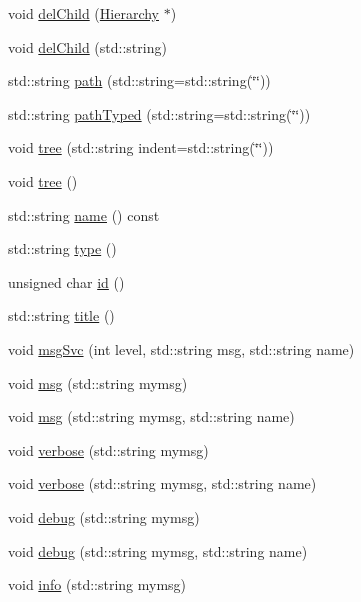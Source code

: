 \begin{DoxyCompactItemize}
void \hyperlink{classHierarchy_a2b2b359fac003233f65786a616766bde}{delChild} (\hyperlink{classHierarchy}{Hierarchy} $\ast$)
\item 
void \hyperlink{classHierarchy_a1928ac7615fe0b5e55cd707f70dc6781}{delChild} (std::string)
\item 
std::string \hyperlink{classHierarchy_aa7990fa7caf132d83e361ce033c6c65a}{path} (std::string=std::string(\char`\"{}\char`\"{}))
\item 
std::string \hyperlink{classHierarchy_a1efd56cd164d328d2002e53a10a19b8c}{pathTyped} (std::string=std::string(\char`\"{}\char`\"{}))
\item 
void \hyperlink{classHierarchy_a76e914b9a677a22a82deb74d892bf261}{tree} (std::string indent=std::string(\char`\"{}\char`\"{}))
\item 
void \hyperlink{classHierarchy_a594c294c5f60c230e106d522ed008212}{tree} ()
\item 
std::string \hyperlink{classObject_a975e888d50bfcbffda2c86368332a5cd}{name} () const 
\item 
std::string \hyperlink{classObject_a84f99f70f144a83e1582d1d0f84e4e62}{type} ()
\item 
unsigned char \hyperlink{classObject_af99145335cc61ff6e2798ea17db009d2}{id} ()
\item 
std::string \hyperlink{classObject_a73a0f1a41828fdd8303dd662446fb6c3}{title} ()
\item 
void \hyperlink{classObject_a3f9d5537ebce0c0f2bf6ae4d92426f3c}{msgSvc} (int level, std::string msg, std::string name)
\item 
void \hyperlink{classObject_a58b2d0618c2d08cf2383012611528d97}{msg} (std::string mymsg)
\item 
void \hyperlink{classObject_ac5d59299273cee27aacf7de00d2e7034}{msg} (std::string mymsg, std::string name)
\item 
void \hyperlink{classObject_a83d2db2df682907ea1115ad721c1c4a1}{verbose} (std::string mymsg)
\item 
void \hyperlink{classObject_a2d4120195317e2a3c6532e8bb9f3da68}{verbose} (std::string mymsg, std::string name)
\item 
void \hyperlink{classObject_aac010553f022165573714b7014a15f0d}{debug} (std::string mymsg)
\item 
void \hyperlink{classObject_a6c9a0397ca804e04d675ed05683f5420}{debug} (std::string mymsg, std::string name)
\item 
void \hyperlink{classObject_a644fd329ea4cb85f54fa6846484b84a8}{info} (std::string mymsg)
\item 

\end{DoxyCompactItemize}
